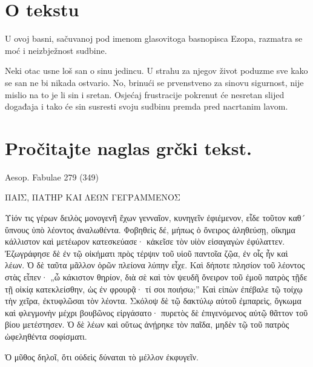 


\section*{O tekstu}

U ovoj basni, sačuvanoj pod imenom glasovitoga basnopisca Ezopa, razmatra se moć i neizbježnost sudbine.

Neki otac usne loš san o sinu jedincu. U strahu za njegov život poduzme sve kako se san ne bi nikada ostvario. No, brinući se prvenstveno za sinovu sigurnost, nije mislio na to je li sin i sretan. Osjećaj frustracije pokrenut će nesretan slijed događaja i tako će sin susresti svoju sudbinu premda pred nacrtanim lavom.


\section*{Pročitajte naglas grčki tekst.}

Aesop. Fabulae 279 (349)


\medskip


{\large

\begin{greek}

\noindent ΠΑΙΣ, ΠΑΤΗΡ ΚΑΙ ΛΕΩΝ ΓΕΓΡΑΜΜΕΝΟΣ

\medskip

\noindent Υἱόν τις γέρων δειλὸς μονογενῆ ἔχων γενναῖον, κυνηγεῖν ἐφιέμενον, εἶδε τοῦτον καθ´ ὕπνους ὑπὸ λέοντος ἀναλωθέντα. Φοβηθεὶς δέ, μήπως ὁ ὄνειρος ἀληθεύσῃ, οἴκημα κάλλιστον καὶ μετέωρον κατεσκεύασε· κἀκεῖσε τὸν υἱὸν εἰσαγαγὼν ἐφύλαττεν. Ἐζωγράφησε δὲ ἐν τῷ οἰκήματι πρὸς τέρψιν τοῦ υἱοῦ παντοῖα ζῷα, ἐν οἷς ἦν καὶ λέων. Ὁ δὲ ταῦτα μᾶλλον ὁρῶν πλείονα λύπην εἶχε. Καὶ δήποτε πλησίον τοῦ λέοντος στὰς εἶπεν· „ὦ κάκιστον θηρίον, διὰ σὲ καὶ τὸν ψευδῆ ὄνειρον τοῦ ἐμοῦ πατρὸς τῇδε τῇ οἰκίᾳ κατεκλείσθην, ὡς ἐν φρουρᾷ· τί σοι ποιήσω;” Καὶ εἰπὼν ἐπέβαλε τῷ τοίχῳ τὴν χεῖρα, ἐκτυφλῶσαι τὸν λέοντα. Σκόλοψ δὲ τῷ δακτύλῳ αὐτοῦ ἐμπαρεὶς, ὄγκωμα καὶ φλεγμονὴν μέχρι βουβῶνος εἰργάσατο· πυρετὸς δὲ ἐπιγενόμενος αὐτῷ θᾶττον τοῦ βίου μετέστησεν. Ὁ δὲ λέων καὶ οὕτως ἀνῄρηκε τὸν παῖδα, μηδὲν τῷ τοῦ πατρὸς ὠφεληθέντα σοφίσματι.

Ὁ μῦθος δηλοῖ, ὅτι οὐδεὶς δύναται τὸ μέλλον ἐκφυγεῖν.

\end{greek}

}



